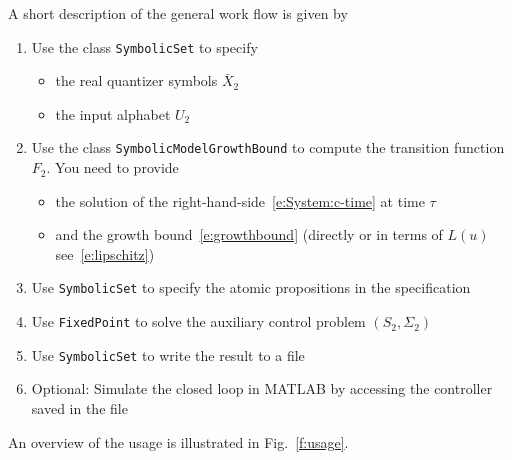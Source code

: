 \documentclass[a4paper]{amsart}
\begin{document}
A short description of the general work flow is given by
\begin{enumerate}
  \item Use the class {\tt\small SymbolicSet} to specify 
    \begin{itemize}
      \item the real quantizer symbols $\bar X_2$ 
      \item the input alphabet $U_2$ 
    \end{itemize}
  \item Use the class {\tt\small SymbolicModelGrowthBound} to compute 
the transition function $F_2$. You
need to provide 
    \begin{itemize}
      \item the solution of the right-hand-side~\eqref{e:System:c-time} at time $\tau$
      \item and the growth bound~\eqref{e:growthbound} (directly or in terms of $L(u)$
    see~\eqref{e:lipschitz})
    \end{itemize}
  \item Use { \tt\small SymbolicSet} to specify the atomic propositions
    in the specification
  \item Use { \tt \small FixedPoint} to solve the auxiliary control problem $(S_2,\Sigma_2)$ 
  \item Use { \tt\small SymbolicSet}  to write the result to a file
  \item Optional: Simulate the closed loop in MATLAB by accessing the
    controller saved in the file
\end{enumerate}

An overview of the usage is illustrated in Fig.~\ref{f:usage}. 
\end{document}
